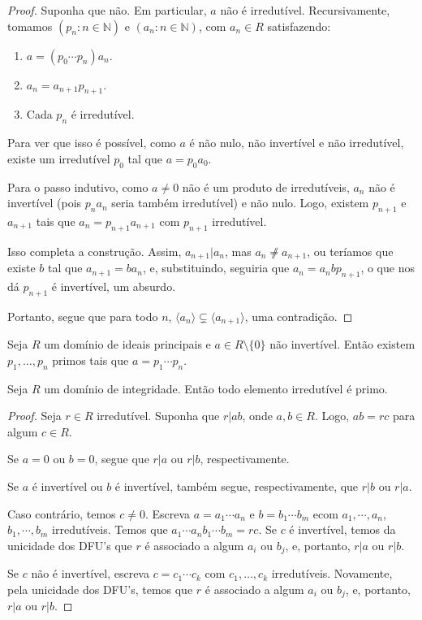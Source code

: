 \begin{proof}
    Suponha que não.
    Em particular, $a$ não é irredutível.
    Recursivamente, tomamos $(p_n: n \in \mathbb N)$ e $(a_n: n \in \mathbb N)$, com $a_n\in R$ satisfazendo:
    \begin{enumerate}[label=\alph*)]
        \item $a=(p_0\cdots p_n) a_n$.
        \item $a_{n}=a_{n+1}p_{n+1}$.
        \item Cada $p_n$ é irredutível.
    \end{enumerate}
    Para ver que isso é possível, como $a$ é não nulo, não invertível e não irredutível, existe um irredutível $p_0$ tal que $a=p_0a_0$.
    
    Para o passo indutivo, como $a\neq 0$ não é um produto de irredutíveis, $a_n$ não é invertível (pois $p_na_n$ seria também irredutível) e não nulo.
    Logo, existem $p_{n+1}$ e $a_{n+1}$ tais que $a_n=p_{n+1}a_{n+1}$ com $p_{n+1}$ irredutível.

    Isso completa a construção.
    Assim, $a_{n+1}|a_{n}$, mas $a_{n}\not \neq a_{n+1}$, ou teríamos que existe $b$ tal que $a_{n+1}=ba_n$, e, substituindo, seguiria que $a_n=a_nbp_{n+1}$, o que nos dá $p_{n+1}$ é invertível, um absurdo.

    Portanto, segue que para todo $n$, $\langle a_n\rangle\subsetneq \langle a_{n+1}\rangle$, uma contradição.
\end{proof}

\begin{corol}
    Seja $R$ um domínio de ideais principais e $a\in R\setminus \{0\}$ não invertível.
    Então existem $p_1, \dots, p_n$ primos tais que $a=p_1\cdots p_n$.
\end{corol}

\begin{prop}
    Seja $R$ um domínio de integridade.
    Então todo elemento irredutível é primo.
\end{prop}
\begin{proof}
Seja $r\in R$ irredutível.
Suponha que $r|ab$, onde $a, b \in R$.
Logo, $ab=rc$ para algum $c \in R$.

Se $a=0$ ou $b=0$, segue que $r|a$ ou $r|b$, respectivamente.

Se $a$ é invertível ou $b$ é invertível, também segue, respectivamente, que $r|b$ ou $r|a$.

Caso contrário, temos $c\neq 0$.
Escreva $a=a_1\cdots a_n$ e $b=b_1\cdots b_m$ ecom $a_1, \cdots, a_n$, $b_1, \cdots, b_m$ irredutíveis.
Temos que $a_1\cdots a_n b_1\cdots b_m=rc$.
Se $c$ é invertível, temos da unicidade dos DFU's que $r$ é associado a algum $a_i$ ou $b_j$, e, portanto, $r|a$ ou $r|b$.

Se $c$ não é invertível, escreva $c=c_1\cdots c_k$ com $c_1, \dots, c_k$ irredutíveis. Novamente, pela unicidade dos DFU's, temos que $r$ é associado a algum $a_i$ ou $b_j$, e, portanto, $r|a$ ou $r|b$.
\end{proof}

